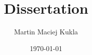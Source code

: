 \documentclass[a4paper]{article}
\title{Dissertation}
\date{\today}
\author{Martin Maciej Kukla}
\begin{document}






\begin{abstract}

\end{abstract}

\newpage


\tableofcontents
\listoffigures









\appendix
\end{document}
